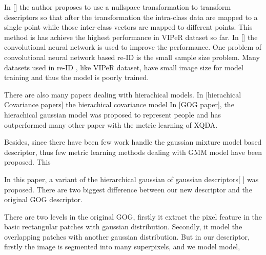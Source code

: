 \documentclass[conference,compsoc]{IEEEtran}
\begin{document}
In [] the author proposes to use a nullspace transformation to transform descriptors so that after the transformation the intra-class data are mapped to a single point while those inter-class vectors are mapped to different points. This method is has achieve the highest performance in VIPeR dataset so far.
In [] the convolutional neural network is used to improve the performance. One problem of convolutional neural network based re-ID is the small sample size problem. Many datasets used in re-ID , like VIPeR dataset, have small image size for model training and thus the model is poorly trained. 

There are also many papers dealing with hierachical models. In [hierachical Covariance papers] the hierachical covariance model  In [GOG paper], the hierachical gaussian model was proposed to represent people and has outperformed many other paper with the metric learning of XQDA. 


Besides, since there have been few work handle the gaussian mixture model based descriptor, thus few metric learning methods dealing with GMM model have been proposed. This

In this paper,  a variant of the hierarchical gaussian of gaussian descriptors[ ] was proposed.  There are two biggest difference between our new descriptor and the original GOG descriptor.

There are two levels in the original GOG, firstly it extract the pixel feature in the basic rectangular patches with gaussian distribution. Secondly, it model the overlapping patches with another gaussian distribution. But in our descriptor, firstly the image is segmented into many superpixels, and we model 
model,







%

%
%
\end{document}

